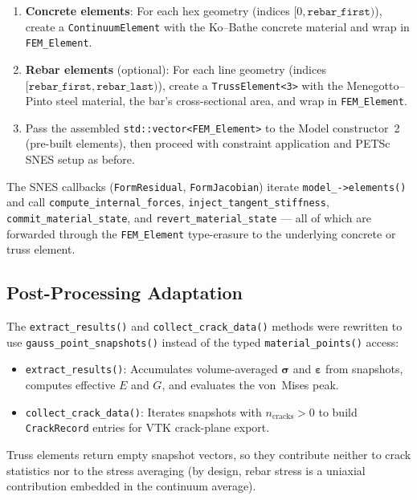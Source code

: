 \begin{enumerate}
  \item \textbf{Concrete elements}: For each hex geometry
    (indices $[0, \mathtt{rebar\_first})$), create a
    \texttt{ContinuumElement} with the Ko--Bathe concrete material and
    wrap in \texttt{FEM\_Element}.
  \item \textbf{Rebar elements} (optional): For each line geometry
    (indices $[\mathtt{rebar\_first}, \mathtt{rebar\_last})$), create a
    \texttt{TrussElement<3>} with the Menegotto--Pinto steel material,
    the bar's cross-sectional area, and wrap in \texttt{FEM\_Element}.
  \item Pass the assembled \texttt{std::vector<FEM\_Element>} to the
    Model constructor~2 (pre-built elements), then proceed with
    constraint application and PETSc SNES setup as before.
\end{enumerate}

The SNES callbacks (\texttt{FormResidual}, \texttt{FormJacobian})
iterate \texttt{model\_->elements()} and call
\texttt{compute\_internal\_forces}, \texttt{inject\_tangent\_stiffness},
\texttt{commit\_material\_state}, and \texttt{revert\_material\_state}
--- all of which are forwarded through the \texttt{FEM\_Element}
type-erasure to the underlying concrete or truss element.

\subsection{Post-Processing Adaptation}

The \texttt{extract\_results()} and \texttt{collect\_crack\_data()}
methods were rewritten to use \texttt{gauss\_point\_snapshots()}
instead of the typed \texttt{material\_points()} access:
\begin{itemize}
  \item \texttt{extract\_results()}: Accumulates volume-averaged
    $\boldsymbol{\sigma}$ and $\boldsymbol{\varepsilon}$ from
    snapshots, computes effective $E$ and $G$, and evaluates the
    von~Mises peak.
  \item \texttt{collect\_crack\_data()}: Iterates snapshots with
    $n_{\text{cracks}} > 0$ to build \texttt{CrackRecord} entries for
    VTK crack-plane export.
\end{itemize}
Truss elements return empty snapshot vectors, so they contribute
neither to crack statistics nor to the stress averaging (by design,
rebar stress is a uniaxial contribution embedded in the continuum
average).


